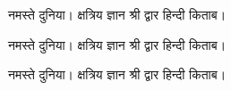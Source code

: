 \documentclass{article}
\begin{document}
{\deva नमस्ते दुनिया। क्षत्रिय ज्ञान श्री द्वार हिन्दी किताब।}

{\kohinoor नमस्ते दुनिया। क्षत्रिय ज्ञान श्री द्वार हिन्दी किताब।}

{\freeserif नमस्ते दुनिया। क्षत्रिय ज्ञान श्री द्वार हिन्दी किताब।}
\end{document}
